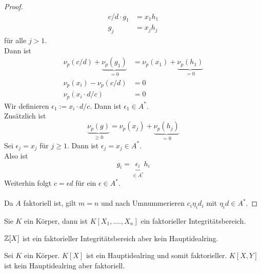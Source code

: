 \begin{proof}
		\begin{align*}
		c/d\cdot g_1&=x_1h_1\\
		g_j&=x_jh_j
		\end{align*}
		für alle $j>1$.\\
		Dann ist
		\begin{align*}
		\nu_p(c/d)+\underbrace{\nu_p(g_1)}_{=0}&=\nu_p(x_1)+\underbrace{\nu_p(h_1)}_{=0}\\
		\nu_p(x_i)-\nu_p(c/d)&=0\\
		\nu_p(x_i\cdot d/c)&=0
		\end{align*}
		Wir definieren $\epsilon_1:=x_i\cdot d/c$. Dann ist $\epsilon_1\in A^*$.\\
		Zusätzlich ist
		\[\underbrace{\nu_p(g)}_{\geq 0}=\nu_p(x_j)+\underbrace{\nu_p(h_j)}_{=0}\]
		Sei $\epsilon_j=x_j$ für $j\geq 1$.
		Dann ist $\epsilon_j=x_j\in A^*$.\\
		Also ist
		\[g_i=\underbrace{\epsilon_i}_{\in A^*}h_i\]
		Weiterhin folgt $c=\epsilon d$ für ein $\epsilon\in A^*$.\\
		\\
		Da $A$ faktoriell ist, gilt $m=n$ und nach Umnummerieren $c_i\eta_id_i$ mit $\eta_id\in A^*$.
	\end{proof}

	\begin{kor}
		Sie $K$ ein Körper, dann ist $K[X_1,....,X_n]$ ein faktorieller Integritätsbereich.
	\end{kor}

	\begin{exmlist}
		\begin{exm}
			$\mathbb{Z}[X]$ ist ein faktorieller Integritätsbereich aber kein Hauptidealring.
		\end{exm}
		\begin{exm}
			Sei $K$ ein Körper. $K[X]$ ist ein Hauptidealring und somit faktorieller. $K[X,Y]$ ist kein Hauptidealring aber faktoriell.
		\end{exm}
	\end{exmlist}
	
	
